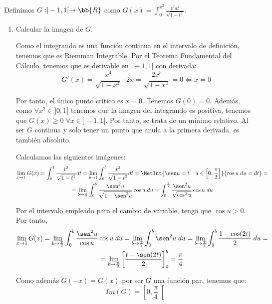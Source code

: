 \documentclass[12pt]{article}
\begin{document}
\begin{ejercicio} 
    Definimos $G:]-1,1[ \to \bb{R}$ como $G(x)=\int_0^{x^2} \frac{t^2dt}{\sqrt{1-t^2}}$.

    \begin{enumerate}
        \item Calcular la imagen de $G$.

        Como el integrando es una función continua en el intervalo de definición, tenemos que es Riemman Integrable. Por el Teorema Fundamental del Cálculo, tenemos que es derivable en $]-1,1[$ con derivada:
        \begin{equation*}
            G'(x)=\frac{x^4}{\sqrt{1-x^4}}\cdot 2x
            = \frac{2x^5}{\sqrt{1-x^4}} = 0 \Longleftrightarrow x=0
        \end{equation*}

        Por tanto, el único punto crítico es $x=0$. Tenemos $G(0)=0$. Además, como $\forall x^2\in ]0,1[$ tenemos que la imagen del integrando es positiva, tenemos que $G(x)\geq 0\;\forall x\in ]-1,1[$. Por tanto, se trata de un mínimo relativo. Al ser $G$ continua y solo tener un punto que anula a la primera derivada, es también absoluto. 

        Calculamos las siguientes imágenes:
        \begin{multline*}
            \lim_{x\to 1}G(x)=\int_0^1 \frac{t^2}{\sqrt{1-t^2}}dt
            = \lim_{b\to 1}\int_0^b \frac{t^2}{\sqrt{1-t^2}}dt
            =\MetInt{\sen u =t \quad u\in \left[0,\frac{\pi}{2}\right]}{\cos u\; du = dt}
            =\\=\lim_{b\to \frac{\pi}{2}}\int_0^b \frac{\sen^2 u}{\sqrt{1-\sen ^2 u}}\cos u \;du
            =\int_0^{\frac{\pi}{2}} \frac{\sen^2 u}{\sqrt{\cos ^2 u}}\cos u \;du
        \end{multline*}

        Por el intervalo empleado para el cambio de variable, tengo que $\cos u >0$. Por tanto,
        \begin{multline*}
            \lim_{x\to 1}G(x)=\lim_{b\to \frac{\pi}{2}}\int_0^b \frac{\sen^2 u}{\cos u}\cos u \;du
            = \lim_{b\to \frac{\pi}{2}}\int_0^b \sen^2 u \;du
            = \lim_{b\to \frac{\pi}{2}}\int_0^b \frac{1-\cos(2t)}{2} \;du
            =\\=\lim_{b\to \frac{\pi}{2}} \left[\frac{t-\sen(2t)}{2}\right]_0^b
            = \frac{\pi}{4}
        \end{multline*}

        Como además $G(-x)=G(x)$ por ser $G$ una función par, tenemos que:
        \begin{equation*}
            Im(G)=\left[0,\frac{\pi}{4} \right[
        \end{equation*}
        

\end{enumerate}
\end{ejercicio}
\end{document}
